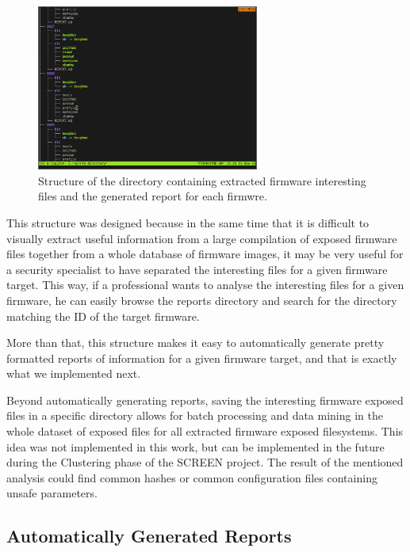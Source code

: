 \begin{figure}[H]
    \centering
    \includegraphics[width=0.65\textwidth]{figs/tree.png}
    \caption{Structure of the directory containing extracted firmware interesting files and the generated report for each firmwre.}
    \label{fig:reports-directory}
\end{figure}

This structure was designed because in the same time that it is difficult to visually extract useful information from a large compilation of exposed firmware files together from a whole database of firmware images, it may be very useful for a security specialist to have separated the interesting files for a given firmware target. This way, if a professional wants to analyse the interesting files for a given firmware, he can easily browse the reports directory and search for the directory matching the ID of the target firmware.

More than that, this structure makes it easy to automatically generate pretty formatted reports of information for a given firmware target, and that is exactly what we implemented next.

Beyond automatically generating reports, saving the interesting firmware exposed files in a specific directory allows for batch processing and data mining in the whole dataset of exposed files for all extracted firmware exposed filesystems. This idea was not implemented in this work, but can be implemented in the future during the Clustering phase of the SCREEN project. The result of the mentioned analysis could find common hashes or common configuration files containing unsafe parameters.

\subsection{Automatically Generated Reports}
\label{sec:auto-reports}

